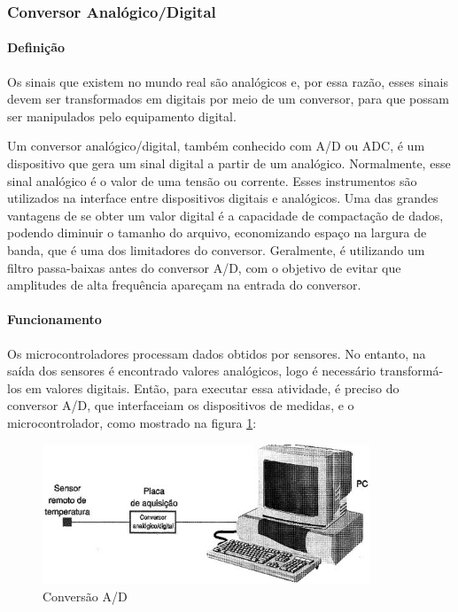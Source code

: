 \subsubsection{Conversor Analógico/Digital}
      \paragraph{Definição}

      Os sinais que existem no mundo real são analógicos e, por essa razão, esses sinais devem ser transformados em digitais por meio de um conversor, para que possam ser manipulados pelo equipamento digital.

      Um conversor analógico/digital, também conhecido com A/D ou ADC, é um dispositivo que gera um sinal digital a partir de um analógico. Normalmente, esse sinal analógico é o valor de uma tensão ou corrente. Esses instrumentos são utilizados na interface entre dispositivos digitais e analógicos. Uma das grandes vantagens de se obter um valor digital é a capacidade de compactação de dados, podendo diminuir o tamanho do arquivo, economizando espaço na largura de banda, que é uma dos limitadores do conversor. Geralmente, é utilizando um filtro passa-baixas antes do conversor A/D, com o objetivo de evitar que amplitudes de alta frequência apareçam na entrada do conversor.

      \paragraph{Funcionamento}

      Os microcontroladores processam dados obtidos por sensores. No entanto, na saída dos sensores é encontrado valores analógicos, logo é necessário transformá-los em valores digitais. Então, para executar essa atividade, é preciso do conversor A/D, que interfaceiam os dispositivos de medidas, e o microcontrolador, como mostrado na figura \ref{img:conversorAD}:

      \begin{figure}[h]
        \raggedleft
        \includegraphics[width=0.87\textwidth]{figuras/conversorAD}
        \caption{Conversão A/D}
        \label{img:conversorAD}
      \end{figure}

